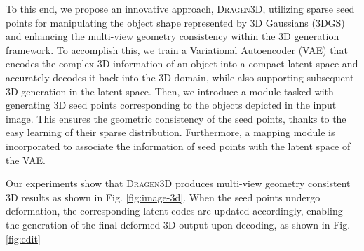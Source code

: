 %
To this end, we propose an innovative approach, \textsc{Dragen3D}, utilizing sparse seed points for manipulating the object shape represented by 3D Gaussians (3DGS) and enhancing the multi-view geometry consistency within the 3D generation framework.
%
%
To accomplish this, we train a Variational Autoencoder (VAE) that encodes the complex 3D information of an object into a compact latent space and accurately decodes it back into the 3D domain, while also supporting subsequent 3D generation in the latent space.
%
Then, we introduce a module tasked with generating 3D seed points corresponding to the objects depicted in the input image. This ensures the geometric consistency of the seed points, thanks to the easy learning of their sparse distribution.
%
Furthermore, a mapping module is incorporated to associate the information of seed points with the latent space of the VAE. 



Our experiments show that \textsc{Dragen3D} produces multi-view geometry consistent 3D results as shown in Fig. \ref{fig:image-3d}. When the seed points undergo deformation, the corresponding latent codes are updated accordingly, enabling the generation of the final deformed 3D output upon decoding, as shown in Fig. \ref{fig:edit}

